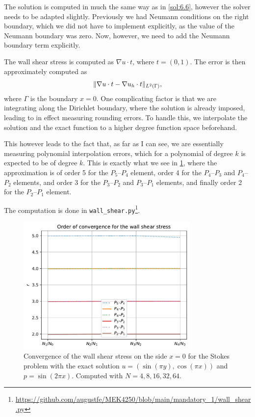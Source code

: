 \begin{solution}{6.7}
    The solution is computed in much the same way as in \cref{sol:6.6}, however the solver needs to be adapted slightly.
    Previously we had Neumann conditions on the right boundary, which we did not have to implement explicitly, as the value of the Neumann boundary was zero.
    Now, however, we need to add the Neumann boundary term explicitly.

    The wall shear stress is computed as $\nabla u \cdot t$, where $t = (0, 1)$.
    The error is then approximately computed as
    \begin{equation*}
        \lVert\nabla u \cdot t - \nabla u_h \cdot t\rVert_{L^2(\Gamma)},
    \end{equation*}
    where $\Gamma$ is the boundary $x = 0$.
    One complicating factor is that we are integrating along the Dirichlet boundary, where the solution is already imposed, leading to in effect measuring rounding errors.
    To handle this, we interpolate the solution and the exact function to a higher degree function space beforehand.

    This however leads to the fact that, as far as I can see, we are essentially measuring polynomial interpolation errors, which for a polynomial of degree $k$ is expected to be of degree $k$.
    This is exactly what we see in \cref{fig:wall_shear_stress}, where the approximation is of order 5 for the $P_5$--$P_4$ element, order 4 for the $P_4$--$P_3$ and $P_4$--$P_2$ elements, and order 3 for the $P_3$--$P_2$ and $P_3$--$P_1$ elements, and finally order 2 for the $P_2$--$P_1$ element.

    The computation is done in \texttt{wall\_shear.py}\footnote{\url{https://github.com/augustfe/MEK4250/blob/main/mandatory_1/wall_shear.py}}.

    \begin{figure}[htbp]
        \centering
        \includegraphics[width=0.8\textwidth]{wall_shear.pdf}
        \caption{Convergence of the wall shear stress on the side $x = 0$ for the Stokes problem with the exact solution $u = (\sin(\pi y), \cos(\pi x))$ and $p = \sin(2 \pi x)$. Computed with $N = 4, 8, 16, 32, 64$.\label{fig:wall_shear_stress}}
    \end{figure}
\end{solution}